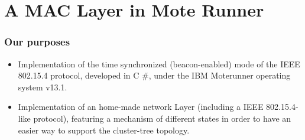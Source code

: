 \section{A MAC Layer in Mote Runner}
\begin{frame}[fragile]
  \frametitle{Our purposes}
  \begin{itemize}
   \item Implementation of the time synchronized (beacon-enabled) mode of the IEEE 802.15.4 protocol, developed in C \#, under the IBM Moterunner operating system v13.1.
   \item Implementation of an home-made network Layer (including a IEEE 802.15.4-like protocol), featuring a mechanism of different states in order to have an easier
   way to support the cluster-tree topology.
  \end{itemize}

  
\end{frame}
